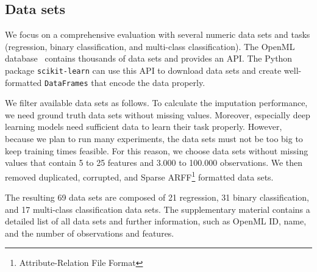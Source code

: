 \documentclass[utf8]{frontiersSCNS} %
\newcommand{\code}[1]{\texttt{#1}}
\begin{document}
\subsection{Data sets}
\label{sec:datasets}
%
We focus on a comprehensive evaluation with several numeric data sets and tasks (regression, binary classification, and multi-class classification). The OpenML database~\citep{OpenML2013} contains thousands of data sets and provides an API. The Python package \code{scikit-learn} \citep{scikit-learn} can use this API to download data sets and create well-formatted \code{DataFrames} that encode the data properly.

We filter available data sets as follows. To calculate the imputation performance, we need ground truth data sets without missing values. Moreover, especially deep learning models need sufficient data to learn their task properly. However, because we plan to run many experiments, the data sets must not be too big to keep training times feasible. For this reason, we choose data sets without missing values that contain 5 to 25 features and 3.000 to 100.000 observations. We then removed duplicated, corrupted, and Sparse ARFF\footnote{Attribute-Relation File Format} formatted data sets.

The resulting 69 data sets are composed of 21 regression, 31 binary classification, and 17 multi-class classification data sets. The supplementary material contains a detailed list of all data sets and further information, such as OpenML ID, name, and the number of observations and features.
\end{document}
